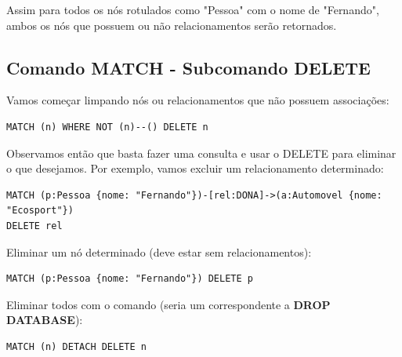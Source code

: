 Assim para todos os nós rotulados como "Pessoa" com o nome de "Fernando", ambos os nós que possuem ou não relacionamentos serão retornados.

\subsection{Comando MATCH - Subcomando DELETE}
Vamos começar limpando nós ou relacionamentos que não possuem associações:
\begin{lstlisting}[]
MATCH (n) WHERE NOT (n)--() DELETE n
\end{lstlisting}

Observamos então que basta fazer uma consulta e usar o DELETE para eliminar o que desejamos. Por exemplo, vamos excluir um relacionamento determinado:
\begin{lstlisting}[]
MATCH (p:Pessoa {nome: "Fernando"})-[rel:DONA]->(a:Automovel {nome: "Ecosport"})
DELETE rel
\end{lstlisting}

Eliminar um nó determinado (deve estar sem relacionamentos):
\begin{lstlisting}[]
MATCH (p:Pessoa {nome: "Fernando"}) DELETE p
\end{lstlisting}

Eliminar todos com o comando (seria um correspondente a \textbf{DROP DATABASE}):
\begin{lstlisting}[]
MATCH (n) DETACH DELETE n
\end{lstlisting}

